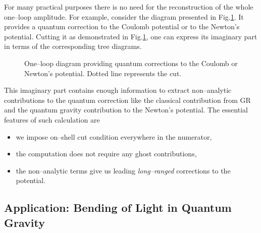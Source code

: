 \documentclass[12pt]{article}
\begin{document}
For many practical purposes there is no need for the reconstruction of the whole one--loop amplitude. For example, consider the diagram presented in Fig.\ref{Fig:cut}. It provides a quantum correction to the Coulomb potential or to the Newton's potential. Cutting it as demonstrated in Fig.\ref{Fig:cut}, one can express its imaginary part in terms of the corresponding tree diagrams.
\begin{figure}[h!]
\begin{center}
\begin{minipage}[h]{0.9\linewidth}
\caption{One--loop diagram providing quantum corrections to the Coulomb or Newton's potential. Dotted line represents the cut.}
\label{Fig:cut}
\end{minipage}
\end{center}
\end{figure}
This imaginary part contains enough information to extract non--analytic contributions to the quantum correction like the classical contribution from GR and the quantum gravity contribution to the Newton's potential. The essential features of such calculation are
\begin{itemize}
\item we impose on--shell cut condition everywhere in the numerator,
\item the computation does not require any ghost contributions,
\item the non--analytic terms give us leading \textit{long--ranged} corrections to the potential.
\end{itemize}

\subsection{Application: Bending of Light in Quantum Gravity}
\end{document}
